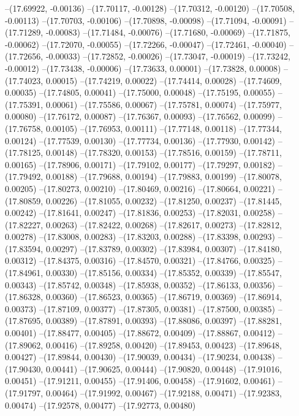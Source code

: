 --(17.69922, -0.00136)
--(17.70117, -0.00128)
--(17.70312, -0.00120)
--(17.70508, -0.00113)
--(17.70703, -0.00106)
--(17.70898, -0.00098)
--(17.71094, -0.00091)
--(17.71289, -0.00083)
--(17.71484, -0.00076)
--(17.71680, -0.00069)
--(17.71875, -0.00062)
--(17.72070, -0.00055)
--(17.72266, -0.00047)
--(17.72461, -0.00040)
--(17.72656, -0.00033)
--(17.72852, -0.00026)
--(17.73047, -0.00019)
--(17.73242, -0.00012)
--(17.73438, -0.00006)
--(17.73633, 0.00001)
--(17.73828, 0.00008)
--(17.74023, 0.00015)
--(17.74219, 0.00022)
--(17.74414, 0.00028)
--(17.74609, 0.00035)
--(17.74805, 0.00041)
--(17.75000, 0.00048)
--(17.75195, 0.00055)
--(17.75391, 0.00061)
--(17.75586, 0.00067)
--(17.75781, 0.00074)
--(17.75977, 0.00080)
--(17.76172, 0.00087)
--(17.76367, 0.00093)
--(17.76562, 0.00099)
--(17.76758, 0.00105)
--(17.76953, 0.00111)
--(17.77148, 0.00118)
--(17.77344, 0.00124)
--(17.77539, 0.00130)
--(17.77734, 0.00136)
--(17.77930, 0.00142)
--(17.78125, 0.00148)
--(17.78320, 0.00153)
--(17.78516, 0.00159)
--(17.78711, 0.00165)
--(17.78906, 0.00171)
--(17.79102, 0.00177)
--(17.79297, 0.00182)
--(17.79492, 0.00188)
--(17.79688, 0.00194)
--(17.79883, 0.00199)
--(17.80078, 0.00205)
--(17.80273, 0.00210)
--(17.80469, 0.00216)
--(17.80664, 0.00221)
--(17.80859, 0.00226)
--(17.81055, 0.00232)
--(17.81250, 0.00237)
--(17.81445, 0.00242)
--(17.81641, 0.00247)
--(17.81836, 0.00253)
--(17.82031, 0.00258)
--(17.82227, 0.00263)
--(17.82422, 0.00268)
--(17.82617, 0.00273)
--(17.82812, 0.00278)
--(17.83008, 0.00283)
--(17.83203, 0.00288)
--(17.83398, 0.00293)
--(17.83594, 0.00297)
--(17.83789, 0.00302)
--(17.83984, 0.00307)
--(17.84180, 0.00312)
--(17.84375, 0.00316)
--(17.84570, 0.00321)
--(17.84766, 0.00325)
--(17.84961, 0.00330)
--(17.85156, 0.00334)
--(17.85352, 0.00339)
--(17.85547, 0.00343)
--(17.85742, 0.00348)
--(17.85938, 0.00352)
--(17.86133, 0.00356)
--(17.86328, 0.00360)
--(17.86523, 0.00365)
--(17.86719, 0.00369)
--(17.86914, 0.00373)
--(17.87109, 0.00377)
--(17.87305, 0.00381)
--(17.87500, 0.00385)
--(17.87695, 0.00389)
--(17.87891, 0.00393)
--(17.88086, 0.00397)
--(17.88281, 0.00401)
--(17.88477, 0.00405)
--(17.88672, 0.00409)
--(17.88867, 0.00412)
--(17.89062, 0.00416)
--(17.89258, 0.00420)
--(17.89453, 0.00423)
--(17.89648, 0.00427)
--(17.89844, 0.00430)
--(17.90039, 0.00434)
--(17.90234, 0.00438)
--(17.90430, 0.00441)
--(17.90625, 0.00444)
--(17.90820, 0.00448)
--(17.91016, 0.00451)
--(17.91211, 0.00455)
--(17.91406, 0.00458)
--(17.91602, 0.00461)
--(17.91797, 0.00464)
--(17.91992, 0.00467)
--(17.92188, 0.00471)
--(17.92383, 0.00474)
--(17.92578, 0.00477)
--(17.92773, 0.00480)

